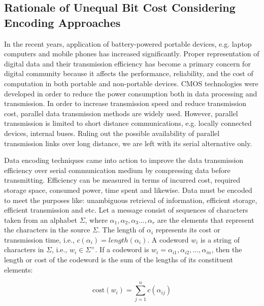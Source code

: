 \documentclass[preprint,12pt]{elsarticle}
\begin{document}
\subsection{Rationale of Unequal Bit Cost Considering Encoding Approaches}
In the recent years, application of battery-powered portable devices, e.g. laptop computers and mobile phones has increased significantly. Proper representation of digital data and their transmission efficiency has become a primary concern for digital community because it affects the performance, reliability, and the cost of computation in both portable and non-portable devices. CMOS technologies were developed in order to reduce the power consumption both in data processing and transmission. In order to increase transmission speed and reduce transmission cost, parallel data transmission methods are widely used. However, parallel transmission is limited to short distance communications, e.g. locally connected devices, internal buses. Ruling out the possible availability of parallel transmission
links over long distance, we are left with its serial alternative only. 

Data encoding techniques came into action to improve the data transmission efficiency over serial communication medium by compressing data before transmitting. Efficiency can be measured in terms of incurred cost, required storage space, consumed power, time spent and likewise. Data must be
encoded to meet the purposes like: unambiguous retrieval of information, efficient storage, efficient transmission and etc. Let a message consist of sequences of characters taken from an alphabet $\Sigma$, where  $\alpha_1,\alpha_2,\alpha_3\ldots,\alpha_r$ are the elements that represent the characters in the source $\Sigma$. The length of $\alpha_i$ represents its cost or transmission time, i.e., $c\left(\alpha_i\right)= length(\alpha_i)$. A codeword $w_i$ is a string of characters in $\Sigma$, i.e., $w_i\in\Sigma^{+}$. If a codeword is $w_i=\alpha_{i1},\alpha_{i2},\ldots,\alpha_{in}$, then the length or cost of the codeword is the sum of the lengths of its constituent elements:

\begin{equation}
\label{eqn1}
  \text{cost}\left(w_i\right)=\sum_{j=1}^{n}c\left(\alpha_{ij}\right)
\end{equation} 
  
\end{document}
